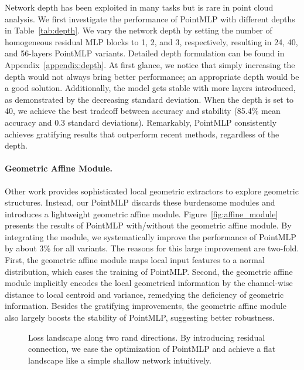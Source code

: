 \documentclass{article} \usepackage{iclr2022_conference,times}
\begin{document}
    
Network depth has been exploited in many tasks but is rare in point cloud analysis. We first investigate the performance of PointMLP with different depths in Table~\ref{tab:depth}. We vary the network depth by setting the number of homogeneous residual MLP blocks to 1, 2, and 3, respectively, resulting in 24, 40, and 56-layers PointMLP variants. Detailed depth formulation can be found in Appendix~\ref{appendix:depth}. At first glance, we notice that simply increasing the depth would not always bring better performance; an appropriate depth would be a good solution. Additionally, the model gets stable with more layers introduced, as demonstrated by the decreasing standard deviation. When the depth is set to 40, we achieve the best tradeoff between accuracy and stability (85.4\% mean accuracy and 0.3 standard deviations). Remarkably, PointMLP consistently achieves gratifying results that outperform recent methods, regardless of the depth. 

\paragraph{Geometric Affine Module.}  Other work provides sophisticated local geometric extractors to explore geometric structures. Instead, our PointMLP discards these burdensome modules and introduces a lightweight geometric affine module.
Figure~\ref{fig:affine_module} presents the results of PointMLP with/without the geometric affine module. By integrating the module, we systematically improve the performance of PointMLP by about 3\% for all variants. The reasons for this large improvement are two-fold. First, the geometric affine module maps local input features to a normal distribution, which eases the training of PointMLP. Second, the geometric affine module implicitly encodes the local geometrical information by the channel-wise distance to local centroid and variance, remedying the deficiency of geometric information. Besides the gratifying improvements, the geometric affine module also largely boosts the stability of PointMLP, suggesting better robustness.

\begin{wrapfigure}{r}{0.7\textwidth}
    \centering
        
    \vspace{-6mm}
    \hspace{3mm}
    \caption{
    Loss landscape along two rand directions. By introducing residual connection, we ease the optimization of PointMLP and achieve a flat landscape like a simple shallow network intuitively.  
    }
    \vspace{-3mm}
    \label{fig:losssurface}
\end{wrapfigure}
\end{document}
